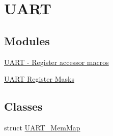 \hypertarget{group___u_a_r_t___peripheral}{}\section{U\+A\+RT}
\label{group___u_a_r_t___peripheral}
\subsection*{Modules}
\begin{DoxyCompactItemize}
\item 
\hyperlink{group___u_a_r_t___register___accessor___macros}{U\+A\+R\+T -\/ Register accessor macros}
\item 
\hyperlink{group___u_a_r_t___register___masks}{U\+A\+R\+T Register Masks}
\end{DoxyCompactItemize}
\subsection*{Classes}
\begin{DoxyCompactItemize}
\item 
struct \hyperlink{struct_u_a_r_t___mem_map}{U\+A\+R\+T\+\_\+\+Mem\+Map}
\end{DoxyCompactItemize}
